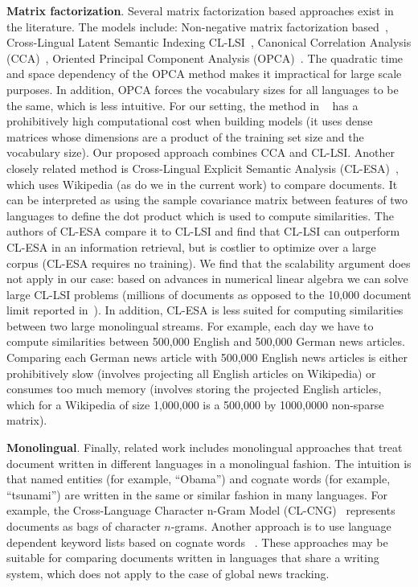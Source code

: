 \textbf{Matrix factorization}. Several matrix factorization based approaches exist in the literature. The models include: Non-negative matrix factorization based~\cite{nonnegfactor_lsi}, Cross-Lingual Latent Semantic Indexing CL-LSI~\cite{cl_lsi,multilingualBook}, Canonical Correlation Analysis (CCA)~\cite{Hotelling}, Oriented Principal Component Analysis (OPCA)~\cite{platt2010translingual}. The quadratic time and space dependency of the OPCA method makes it impractical for large scale purposes. In addition, OPCA forces the vocabulary sizes for all languages to be the same, which is less intuitive. For our setting, the method in ~\cite{nonnegfactor_lsi} has a prohibitively high computational cost when building models (it uses dense matrices whose dimensions are a product of the training set size and the vocabulary size). Our proposed approach combines CCA and CL-LSI. Another closely related method is Cross-Lingual Explicit Semantic Analysis (CL-ESA)~\cite{ESA}, which uses Wikipedia (as do we in the current work) to compare documents. It can be interpreted as using the sample covariance matrix between features of two languages to define the dot product which is used to compute similarities.
The authors of CL-ESA compare it to CL-LSI and find that CL-LSI can outperform CL-ESA in an information retrieval, but is costlier to optimize over a large corpus (CL-ESA requires no training). We find that the scalability argument does not apply in our case: based on advances in numerical linear algebra we can solve large CL-LSI problems (millions of documents as opposed to the 10,000 document limit reported in~\cite{ESA}). In addition, CL-ESA is less suited for computing similarities between two large monolingual streams. For example, each day we have to compute similarities between 500,000 English and 500,000 German news articles. Comparing each German news article with 500,000 English news articles is either prohibitively slow (involves projecting all English articles on Wikipedia) or consumes too much memory (involves storing the projected English articles, which for a Wikipedia of size 1,000,000 is a 500,000 by 1000,0000 non-sparse matrix).

\textbf{Monolingual}. Finally, related work includes monolingual approaches that treat document written in different languages in a monolingual fashion. The intuition is that named entities (for example, ``Obama'') and cognate words (for example, ``tsunami'') are written in the same or similar fashion in many languages. For example, the Cross-Language Character n-Gram Model (CL-CNG)~\cite{plagiarism} represents documents as bags of character $n$-grams. Another approach is to use language dependent keyword lists based on cognate words ~\cite{pouliquen2008story}. These approaches may be suitable for comparing documents written in languages that share a writing system, which does not apply to the case of global news tracking.


